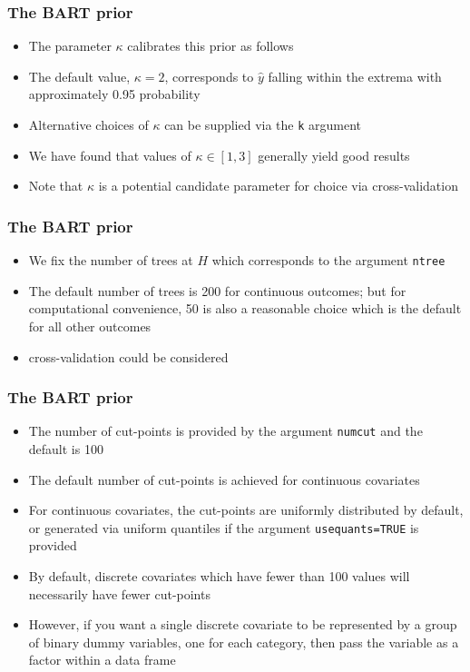 \documentclass[11pt,dvipsnames,usenames,times]{beamer}
\newcommand*{\code}[1]{{\tt #1}}
\begin{document}
\begin{frame}[fragile]
\frametitle{The BART prior}
\begin{itemize}
\item The parameter $\kappa$ calibrates this prior as follows
\item 
The default value, $\kappa=2$, corresponds to
$\hat{y}$ falling within the extrema with approximately 0.95
probability
\item  Alternative choices of
$\kappa$ can be supplied via the \code{k} argument
\item We have found that
values of $\kappa \in [1, 3]$ generally yield good results
\item Note that
$\kappa$ is a potential candidate parameter for choice via
cross-validation
\end{itemize}
\end{frame}


\begin{frame}[fragile]
\frametitle{The BART prior}
\begin{itemize}
\item We fix the number of
trees at $H$ which corresponds to the argument \code{ntree}
\item The
default number of trees is 200 for continuous outcomes; but for
computational convenience, 50 is also a reasonable choice which is the
default for all other outcomes
\item cross-validation could be considered
\end{itemize}
\end{frame}

\begin{frame}[fragile]
\frametitle{The BART prior}
\begin{itemize}
\item 
The number of cut-points is provided by the argument \code{numcut} and
the default is 100
\item The default number of cut-points is achieved for
continuous covariates
\item For continuous covariates, the cut-points are
uniformly distributed by default, or generated via uniform quantiles
if the argument \code{usequants=TRUE} is provided
\item By default,
discrete covariates which have fewer than 100 values will necessarily
have fewer cut-points
\item  However, if you want a single discrete
covariate to be represented by a group of binary dummy variables, one
for each category, then pass the variable as a factor within a data
frame
\end{itemize}
\end{frame}
\end{document}
